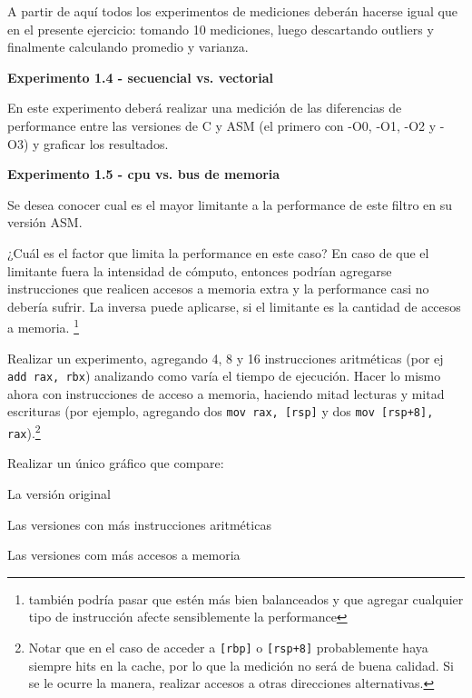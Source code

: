 A partir de aquí todos los experimentos de mediciones deberán hacerse igual 
que en el presente ejercicio: tomando 10 mediciones, luego descartando 
outliers y finalmente calculando promedio y varianza.

\noindent\textbf{Experimento 1.4 - secuencial vs. vectorial}

En este experimento deberá realizar una medición de las diferencias de 
performance entre las versiones de C y ASM (el primero con -O0, -O1, -O2 y -O3) 
y graficar los resultados.

\vspace*{0.3cm} \noindent
\textbf{Experimento 1.5 - cpu vs. bus de memoria}

Se desea conocer cual es el mayor limitante a la
performance de este filtro en su versión ASM.

¿Cuál es el factor que limita la performance en este caso?
En caso de que el limitante fuera la intensidad de cómputo, entonces 
podrían agregarse instrucciones que realicen accesos a memoria extra y la
performance casi no debería sufrir. 
La inversa puede aplicarse, si el limitante es la cantidad de accesos a memoria.
\footnote{también podría pasar que estén más bien balanceados y que agregar
cualquier tipo de instrucción afecte sensiblemente la performance}
	
Realizar un experimento, agregando 4, 8 y 16 instrucciones aritméticas 
(por ej \verb|add rax, rbx|) analizando como varía el tiempo de ejecución.
Hacer lo mismo ahora con instrucciones de acceso a memoria, haciendo 
mitad lecturas y mitad escrituras (por ejemplo, agregando dos 
\verb|mov rax, [rsp]| y dos \verb|mov [rsp+8], rax|).\footnote{Notar que en el caso de acceder a \texttt{[rbp]} o \texttt{[rsp+8]} probablemente haya siempre hits en la cache, por lo que la medición no será de buena calidad. Si se le ocurre la manera, realizar accesos a otras direcciones alternativas.}
	
Realizar un único gráfico que compare:
\begin{inparaenum}
    \item La versión original
    \item Las versiones con más instrucciones aritméticas
    \item Las versiones com más accesos a memoria
\end{inparaenum}

